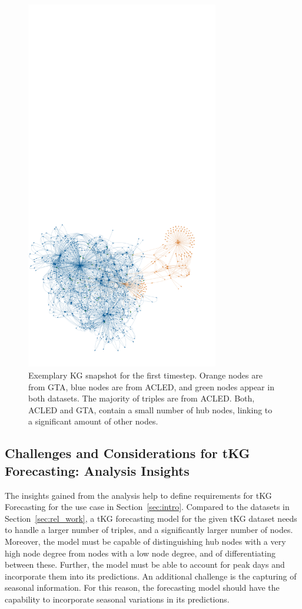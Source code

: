 \begin{figure}
    \centering
    \includegraphics[clip, trim=0cm 3cm 0cm 42cm, width=0.75\textwidth]{figs/snap1_newcolors_horizon.png} %
    \caption{Exemplary KG snapshot for the first timestep. Orange nodes are from GTA, blue nodes are from ACLED, and green nodes appear in both datasets. The majority of triples are from ACLED. Both, ACLED and GTA, contain a small number of hub nodes, linking to a significant amount of other nodes.}
    \label{fig:kg_static}
\end{figure}
\subsection{Challenges and Considerations for tKG Forecasting: Analysis Insights}\label{sec:takeaway}
The insights gained from the analysis help to define requirements for tKG Forecasting for the use case in Section~\ref{sec:intro}. 
Compared to the datasets in Section~\ref{sec:rel_work}, a tKG forecasting model for the given tKG dataset needs to handle a larger number of triples, and a significantly larger number of nodes. Moreover, the model must be capable of distinguishing hub nodes with a very high node degree from nodes with a low node degree, and of differentiating between these. 
Further, the model must be able to account for peak days and incorporate them into its predictions. An additional challenge is the capturing of seasonal information. For this reason, the forecasting model should have the capability to incorporate seasonal variations in its predictions.
